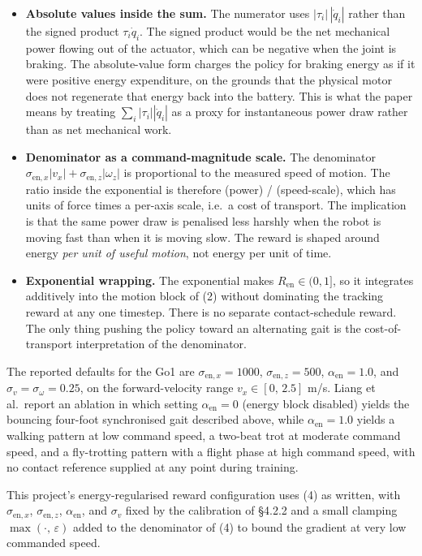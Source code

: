\begin{itemize}
  \item \textbf{Absolute values inside the sum.} The numerator uses $|\tau_i|\,|\dot q_i|$ rather than the signed product $\tau_i \dot q_i$. The signed product would be the net mechanical power flowing out of the actuator, which can be negative when the joint is braking. The absolute-value form charges the policy for braking energy as if it were positive energy expenditure, on the grounds that the physical motor does not regenerate that energy back into the battery. This is what the paper means by treating $\sum_i |\tau_i||\dot q_i|$ as a proxy for instantaneous power draw rather than as net mechanical work.
  \item \textbf{Denominator as a command-magnitude scale.} The denominator $\sigma_{\mathrm{en},x}|v_x| + \sigma_{\mathrm{en},z}|\omega_z|$ is proportional to the measured speed of motion. The ratio inside the exponential is therefore (power) / (speed-scale), which has units of force times a per-axis scale, i.e.\ a cost of transport. The implication is that the same power draw is penalised less harshly when the robot is moving fast than when it is moving slow. The reward is shaped around energy \textit{per unit of useful motion}, not energy per unit of time.
  \item \textbf{Exponential wrapping.} The exponential makes $R_{\mathrm{en}} \in (0, 1]$, so it integrates additively into the motion block of (2) without dominating the tracking reward at any one timestep. There is no separate contact-schedule reward. The only thing pushing the policy toward an alternating gait is the cost-of-transport interpretation of the denominator.
\end{itemize}

The reported defaults for the Go1 are $\sigma_{\mathrm{en},x} = 1000$, $\sigma_{\mathrm{en},z} = 500$, $\alpha_{\mathrm{en}} = 1.0$, and $\sigma_v = \sigma_\omega = 0.25$, on the forward-velocity range $v_x \in [0,\, 2.5]$ m/s. Liang et al.\ report an ablation in which setting $\alpha_{\mathrm{en}} = 0$ (energy block disabled) yields the bouncing four-foot synchronised gait described above, while $\alpha_{\mathrm{en}} = 1.0$ yields a walking pattern at low command speed, a two-beat trot at moderate command speed, and a fly-trotting pattern with a flight phase at high command speed, with no contact reference supplied at any point during training.

This project's energy-regularised reward configuration uses (4) as written, with $\sigma_{\mathrm{en},x}$, $\sigma_{\mathrm{en},z}$, $\alpha_{\mathrm{en}}$, and $\sigma_v$ fixed by the calibration of \S4.2.2 and a small clamping $\max(\cdot,\,\varepsilon)$ added to the denominator of (4) to bound the gradient at very low commanded speed.

